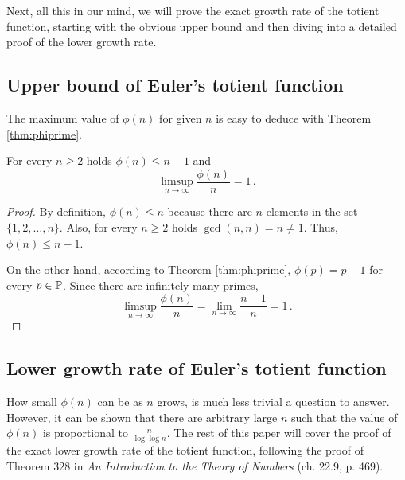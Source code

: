 \documentclass{article}
\begin{document}
Next, all this in our mind, we will prove the exact growth rate of the totient function, starting with the obvious upper bound and then diving into a detailed proof of the lower growth rate.

\subsection{Upper bound of Euler's totient function}

The maximum value of $\phi(n)$ for given $n$ is easy to deduce with Theorem \ref{thm:phiprime}.

\begin{theorem}%
For every $n \geq 2$ holds $\phi(n) \leq n-1$ and
\begin{equation*}
    \limsup_{n \rightarrow \infty}{\frac{\phi(n)}{n}} = 1\,.
\end{equation*}

\begin{proof}

By definition, $\phi(n) \leq n$ because there are $n$ elements in the set $\{1,2,\dots,n\}$. Also, for every $n \geq 2$ holds $\gcd(n,n) = n \neq 1$. Thus, $\phi(n) \leq n-1$.

On the other hand, according to Theorem \ref{thm:phiprime}, $\phi(p) = p-1$ for every $p\in\mathbb{P}$.
Since there are infinitely many primes, %
\begin{equation*}
    \limsup_{n\rightarrow\infty}\frac{\phi(n)}{n} = \lim_{n\rightarrow\infty} \frac{n-1}{n} = 1\,.
\end{equation*}

\end{proof}

\end{theorem}

\subsection{Lower growth rate of Euler's totient function}

How small $\phi(n)$ can be as $n$ grows, is much less trivial a question to answer. However, it can be shown that there are arbitrary large $n$ such that the value of $\phi(n)$ is proportional to $\frac{n}{\log\log n}$. The rest of this paper will cover the proof of the exact lower growth rate of the totient function, following the proof of Theorem $328$
in \textit{An Introduction to the Theory of Numbers} \cite{HardyWright} (ch. 22.9, p. 469).
\end{document}
